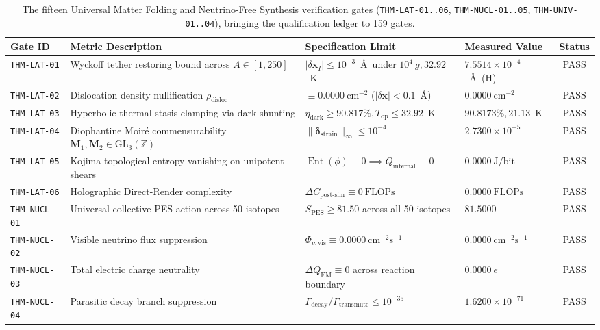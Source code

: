 \documentclass[11pt,onecolumn]{article}
\begin{document}
\begin{table}[!htbp]
\centering\scriptsize
\setlength{\tabcolsep}{3pt}
\caption{The fifteen Universal Matter Folding and Neutrino-Free Synthesis verification gates (\texttt{THM-LAT-01..06}, \texttt{THM-NUCL-01..05}, \texttt{THM-UNIV-01..04}), bringing the qualification ledger to 159 gates.}
\label{tab:matrix_univ_theorems}
\begin{tabularx}{\textwidth}{@{}l p{4.6cm} p{4.0cm} p{2.6cm} c@{}}
\toprule
Gate ID & Metric Description & Specification Limit & Measured Value & Status \\
\midrule
\texttt{THM-LAT-01} & Wyckoff tether restoring bound across $A \in [1, 250]$ & $|\delta\mathbf{x}_I| \le 10^{-3}$~\AA\ under $10^4~g, 32.92$~K & $7.5514\times 10^{-4}$~\AA\ (H) & PASS \\
\texttt{THM-LAT-02} & Dislocation density nullification $\rho_{\text{disloc}}$ & $\equiv 0.0000~\text{cm}^{-2}$ ($|\delta\mathbf{x}| < 0.1$~\AA) & $0.0000~\text{cm}^{-2}$ & PASS \\
\texttt{THM-LAT-03} & Hyperbolic thermal stasis clamping via dark shunting & $\eta_{\text{dark}} \ge 90.817\%, T_{\text{op}} \le 32.92$~K & $90.8173\%, 21.13$~K & PASS \\
\texttt{THM-LAT-04} & Diophantine Moir\'e commensurability $\mathbf{M}_1, \mathbf{M}_2 \in \mathrm{GL}_3(\mathbb{Z})$ & $\|\boldsymbol{\delta}_{\text{strain}}\|_\infty \le 10^{-4}$ & $2.7300\times 10^{-5}$ & PASS \\
\texttt{THM-LAT-05} & Kojima topological entropy vanishing on unipotent shears & $\operatorname{Ent}(\phi) \equiv 0 \implies Q_{\text{internal}} \equiv 0$ & $0.0000~\text{J/bit}$ & PASS \\
\texttt{THM-LAT-06} & Holographic Direct-Render complexity & $\Delta C_{\text{post-sim}} \equiv 0~\text{FLOPs}$ & $0.0000~\text{FLOPs}$ & PASS \\
\texttt{THM-NUCL-01} & Universal collective PES action across 50 isotopes & $S_{\text{PES}} \ge 81.50$ across all 50 isotopes & $81.5000$ & PASS \\
\texttt{THM-NUCL-02} & Visible neutrino flux suppression & $\Phi_{\nu,\text{vis}} \equiv 0.0000~\text{cm}^{-2}\text{s}^{-1}$ & $0.0000~\text{cm}^{-2}\text{s}^{-1}$ & PASS \\
\texttt{THM-NUCL-03} & Total electric charge neutrality & $\Delta Q_{\text{EM}} \equiv 0$ across reaction boundary & $0.0000~e$ & PASS \\
\texttt{THM-NUCL-04} & Parasitic decay branch suppression & $\Gamma_{\text{decay}}/\Gamma_{\text{transmute}} \le 10^{-35}$ & $1.6200\times 10^{-71}$ & PASS \\

\end{tabularx}
\end{table}
\end{document}
